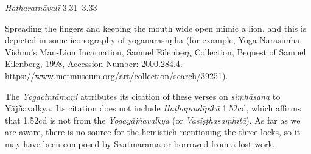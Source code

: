 \begin{ekdosis}
\begin{testimonia}[hp01_050]
\emph{Haṭharatnāvalī} 3.31–3.33

\begin{versinnote}
\end{versinnote}

\end{testimonia}

\begin{philcomm}[hp01_051]

Spreading the fingers and keeping the mouth wide open mimic a lion, and this is depicted in some iconography of yoganarasiṃha (for example, Yoga Narasimha, Vishnu's Man-Lion Incarnation, Samuel Eilenberg Collection, Bequest of Samuel Eilenberg, 1998, Accession Number: 2000.284.4. https://www.metmuseum.org/art/collection/search/39251).  

The \emph{Yogacintāmaṇi} attributes its citation of these verses on \emph{siṃhāsana} to Yājñavalkya. Its citation does not include \emph{Haṭhapradīpikā} 1.52cd, which affirms that 1.52cd is not from the \emph{Yogayājñavalkya} (or \emph{Vasiṣṭhasaṃhitā}). As far as we are aware, there is no source for the hemistich mentioning the three locks, so it may have been composed by Svātmārāma or borrowed from a lost work. %
\end{philcomm}


\end{ekdosis}
